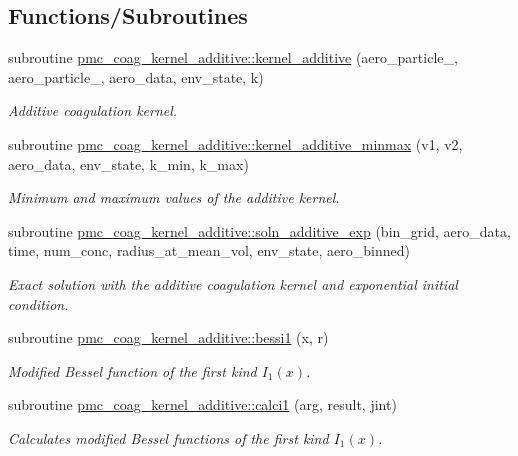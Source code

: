 \subsection*{Functions/\+Subroutines}
\begin{DoxyCompactItemize}
\item 
subroutine \mbox{\hyperlink{namespacepmc__coag__kernel__additive_a104dc134e55b7e9c4271f754feb593c0}{pmc\+\_\+coag\+\_\+kernel\+\_\+additive\+::kernel\+\_\+additive}} (aero\+\_\+particle\+\_, aero\+\_\+particle\+\_, aero\+\_\+data, env\+\_\+state, k)
\begin{DoxyCompactList}\small\item\em Additive coagulation kernel. \end{DoxyCompactList}\item 
subroutine \mbox{\hyperlink{namespacepmc__coag__kernel__additive_a3dee17def226de61de0ca4074f77c86e}{pmc\+\_\+coag\+\_\+kernel\+\_\+additive\+::kernel\+\_\+additive\+\_\+minmax}} (v1, v2, aero\+\_\+data, env\+\_\+state, k\+\_\+min, k\+\_\+max)
\begin{DoxyCompactList}\small\item\em Minimum and maximum values of the additive kernel. \end{DoxyCompactList}\item 
subroutine \mbox{\hyperlink{namespacepmc__coag__kernel__additive_a18a49b373123a332e3e5a91c6f88b6b1}{pmc\+\_\+coag\+\_\+kernel\+\_\+additive\+::soln\+\_\+additive\+\_\+exp}} (bin\+\_\+grid, aero\+\_\+data, time, num\+\_\+conc, radius\+\_\+at\+\_\+mean\+\_\+vol, env\+\_\+state, aero\+\_\+binned)
\begin{DoxyCompactList}\small\item\em Exact solution with the additive coagulation kernel and exponential initial condition. \end{DoxyCompactList}\item 
subroutine \mbox{\hyperlink{namespacepmc__coag__kernel__additive_ad76a37daef190b75b015ac1441f32e17}{pmc\+\_\+coag\+\_\+kernel\+\_\+additive\+::bessi1}} (x, r)
\begin{DoxyCompactList}\small\item\em Modified Bessel function of the first kind $ I_1(x) $. \end{DoxyCompactList}\item 
subroutine \mbox{\hyperlink{namespacepmc__coag__kernel__additive_a033edc5451a3797e4d922139dd6dad0f}{pmc\+\_\+coag\+\_\+kernel\+\_\+additive\+::calci1}} (arg, result, jint)
\begin{DoxyCompactList}\small\item\em Calculates modified Bessel functions of the first kind $ I_1(x) $. \end{DoxyCompactList}\end{DoxyCompactItemize}
